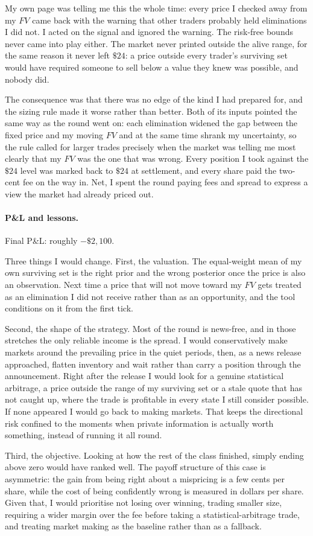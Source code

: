 My own page was telling me this the whole time: every price I checked away from my
$FV$ came back with the warning that other traders probably held eliminations I did
not. I acted on the signal and ignored the warning. The risk-free bounds never came
into play either. The market never printed outside the alive range, for the same
reason it never left $\$24$: a price outside every trader's surviving set would have
required someone to sell below a value they knew was possible, and nobody did.

The consequence was that there was no edge of the kind I had prepared for, and the
sizing rule made it worse rather than better. Both of its inputs pointed the same way as
the round went on: each elimination widened the gap between the fixed price and my
moving $FV$ and at the same time shrank my uncertainty, so the rule
called for larger trades precisely when the market was telling me most clearly that my
$FV$ was the one that was wrong. Every position I took against the $\$24$ level was
marked back to $\$24$ at settlement, and every share paid the two-cent fee on the way
in. Net, I spent the round paying fees and spread to express a view the market had
already priced out.

\paragraph{P\&L and lessons.}
Final P\&L: roughly $-\$2{,}100$. %

Three things I would change. First, the valuation. The equal-weight mean of my own
surviving set is the right prior and the wrong posterior once the price is also an
observation. Next time a price that will not move toward my $FV$ gets treated as an
elimination I did not receive rather than as an opportunity, and the tool conditions
on it from the first tick.

Second, the shape of the strategy. Most of the round is news-free, and in those
stretches the only reliable income is the spread. I would conservatively make markets
around the prevailing price in the quiet periods, then, as a news release approached,
flatten inventory and wait rather than carry a position through the announcement.
Right after the release I would look for a genuine statistical arbitrage, a price
outside the range of my surviving set or a stale quote that has not caught up, where
the trade is profitable in every state I still consider possible. If none appeared I
would go back to making markets. That
keeps the directional risk confined to the moments when private information is actually
worth something, instead of running it all round.

Third, the objective. Looking at how the rest of the class finished, simply ending
above zero would have ranked well. The payoff structure of this case is asymmetric: the
gain from being right about a mispricing is a few cents per share, while the cost of
being confidently wrong is measured in dollars per share. Given that, I would prioritise
not losing over winning, trading smaller size, requiring a wider margin over the fee
before taking a statistical-arbitrage trade, and treating market making as the baseline
rather than as a fallback.
